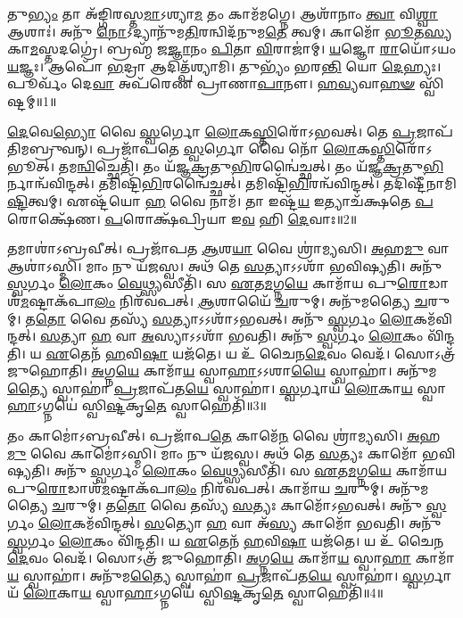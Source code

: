 \setcounter{anuvakam}{0}

   𑌤𑍁\-\ul{𑌭𑍍𑌯𑌂} 𑌤𑌾 𑌅᳴𑌙𑍍𑌗𑌿𑌰𑌸𑍍𑌤\-\ul{𑌮𑌾}\-𑌽𑌶𑍍𑌯𑌾\-\ul{𑌮} 𑌤𑌂 𑌕𑌾𑌮᳴𑌮𑌗𑍍𑌨𑍇।
   𑌆𑌶𑌾᳴𑌨𑌾𑌂 \ul{𑌤𑍍𑌵𑌾} 𑌵𑌿\-\ul{𑌶𑍍𑌵𑌾} 𑌆𑌶𑌾𑌃॑।
   𑌅𑌨𑍁᳴ \ul{𑌨𑍋}\-𑌽𑌦𑍍𑌯𑌾𑌨𑍁᳴𑌮\-\ul{𑌤𑌿}\-𑌰𑌨𑍍𑌵𑌿𑌦᳴𑌨𑍁𑌮\-\ul{𑌤𑍇} 𑌤𑍍𑌵𑌮𑍍।
   𑌕𑌾𑌮𑍋᳴ \ul{𑌭𑍂}\-𑌤\-\ul{𑌸𑍍𑌯} 𑌕𑌾\-\ul{𑌮}\-𑌸𑍍𑌤𑌦𑌗𑍍𑌰𑍇॑।
   𑌬𑍍𑌰𑌹𑍍𑌮᳴ 𑌜\-\ul{𑌜𑍍𑌞𑌾}\-𑌨𑌂 \ul{𑌪𑌿}\-𑌤𑌾 \ul{𑌵𑌿}\-𑌰𑌾𑌜𑌾॑𑌮𑍍।
   \ul{𑌯}\-𑌜𑍍𑌞𑍋 \ul{𑌰𑌾}\-𑌯𑍋᳴𑌽𑌯𑌂 \ul{𑌯}\-𑌜𑍍𑌞𑌃।
   𑌆𑌪𑍋᳴ \ul{𑌭}\-𑌦𑍍𑌰𑌾 𑌆𑌦𑌿𑌤𑍍𑌪᳴𑌶𑍍𑌯𑌾𑌮𑌿।
   𑌤𑍁𑌭𑍍𑌯𑌂᳴ 𑌭𑌰\-\ul{𑌨𑍍𑌤𑌿} 𑌯𑍋 \ul{𑌦𑍇}\-𑌹𑍍𑌯𑌃।
   𑌪𑍂𑌰𑍍𑌵𑌂᳴ 𑌦𑍇\-\ul{𑌵𑌾} 𑌅𑌪᳴𑌰𑍇𑌣 𑌪𑍍𑌰𑌾𑌣𑌾\-\ul{𑌪𑌾}\-𑌨𑍗।
   \ul{𑌹}\-\-\ul{𑌵𑍍𑌯}\-𑌵𑌾\-\ul{𑌹}\-\-\ul{𑍟} 𑌸𑍍𑌵𑌿᳴𑌷𑍍𑌟𑌮𑍍॥1॥\anuvakamend
  

   \ul{𑌦𑍇}\-𑌵𑍇\-\ul{𑌭𑍍𑌯𑍋} 𑌵𑍈 \ul{𑌸𑍍𑌵}\-𑌰𑍍𑌗𑍋 \ul{𑌲𑍋}\-𑌕\-\ul{𑌸𑍍𑌤𑌿}\-𑌰𑍋᳴𑌽𑌭𑌵𑌤𑍍।
   𑌤𑍇 \ul{𑌪𑍍𑌰}\-𑌜𑌾𑌪᳴𑌤𑌿𑌮𑌬𑍍𑌰𑍁𑌵𑌨𑍍।
   𑌪𑍍𑌰𑌜𑌾᳴𑌪𑌤𑍇 \ul{𑌸𑍍𑌵}\-𑌰𑍍𑌗𑍋 𑌵𑍈 𑌨𑍋᳴ \ul{𑌲𑍋}\-𑌕\-\ul{𑌸𑍍𑌤𑌿}\-𑌰𑍋᳴𑌽𑌭𑍂𑌤𑍍।
   𑌤𑌮\-\ul{𑌨𑍍𑌵𑌿}\-𑌚𑍍𑌛𑍇𑌤𑌿᳴।
   𑌤𑌂 𑌯᳴𑌜𑍍𑌞\-\ul{𑌕𑍍𑌰}\-𑌤𑍁\-\ul{𑌭𑌿}\-𑌰𑌨𑍍𑌵𑍈॑𑌚𑍍𑌛𑌤𑍍।
   𑌤𑌂 𑌯᳴𑌜𑍍𑌞\-\ul{𑌕𑍍𑌰}\-𑌤𑍁\-\ul{𑌭𑌿}\-𑌰𑍍𑌨𑌾𑌨𑍍𑌵᳴𑌵𑌿𑌨𑍍𑌦𑌤𑍍।
   𑌤𑌮𑌿𑌷𑍍𑌟𑌿᳴\-\ul{𑌭𑌿}\-𑌰𑌨𑍍𑌵𑍈॑𑌚𑍍𑌛𑌤𑍍।
   𑌤𑌮𑌿𑌷𑍍𑌟𑌿᳴\-\ul{𑌭𑌿}\-𑌰𑌨𑍍𑌵᳴𑌵𑌿𑌨𑍍𑌦𑌤𑍍।
   𑌤𑌦𑌿𑌷𑍍𑌟𑍀᳴𑌨𑌾𑌮𑌿\-\ul{𑌷𑍍𑌟𑌿}\-\-𑌤𑍍𑌵𑌮𑍍।
   𑌏𑌷𑍍𑌟᳴𑌯𑍋 \ul{𑌹} 𑌵𑍈 𑌨𑌾𑌮᳴।
   𑌤𑌾 𑌇𑌷𑍍𑌟᳴\-\ul{𑌯} 𑌇𑌤𑍍𑌯𑌾𑌚᳴𑌕𑍍𑌷𑌤𑍇 \ul{𑌪}\-𑌰𑍋𑌕𑍍𑌷𑍇᳴𑌣।
   \ul{𑌪}\-𑌰𑍋𑌕𑍍𑌷᳴𑌪𑍍𑌰𑌿𑌯𑌾 𑌇\-\ul{𑌵} 𑌹𑌿 \ul{𑌦𑍇}\-𑌵𑌾𑌃॥2॥

   𑌤𑌮𑌾𑌶𑌾॑𑌽𑌬𑍍𑌰𑌵𑍀𑌤𑍍।
   𑌪𑍍𑌰𑌜𑌾᳴𑌪𑌤 \ul{𑌆}\-𑌶\-\ul{𑌯𑌾} 𑌵𑍈 𑌶𑍍𑌰𑌾॑𑌮𑍍𑌯𑌸𑌿।
   \ul{𑌅}\-𑌹\-\ul{𑌮𑍁} 𑌵𑌾 𑌆𑌶𑌾॑𑌽𑌸𑍍𑌮𑌿।
   𑌮𑌾𑌂 𑌨𑍁 𑌯᳴𑌜𑌸𑍍𑌵।
   𑌅𑌥᳴ 𑌤𑍇 \ul{𑌸}\-𑌤𑍍𑌯𑌾𑌽𑌽𑌶𑌾᳴ 𑌭𑌵𑌿𑌷𑍍𑌯𑌤𑌿।
   𑌅𑌨𑍁᳴ \ul{𑌸𑍍𑌵}\-𑌰𑍍𑌗𑌂 \ul{𑌲𑍋}\-𑌕𑌂 \ul{𑌵𑍇}\-𑌥𑍍𑌸𑍍𑌯𑌸𑍀𑌤𑌿᳴।
   𑌸 \ul{𑌏}\-𑌤\-\ul{𑌮}\-𑌗𑍍𑌨\-\ul{𑌯𑍇} 𑌕𑌾𑌮𑌾᳴𑌯 𑌪𑍁\-\ul{𑌰𑍋}\-𑌡𑌾𑌶᳴\-\ul{𑌮}\-𑌷𑍍𑌟𑌾𑌕᳴𑌪𑌾\-\ul{𑌲𑌂} 𑌨𑌿𑌰᳴𑌵𑌪𑌤𑍍।
   \ul{𑌆}\-𑌶𑌾𑌯𑍈᳴ \ul{𑌚}\-𑌰𑍁𑌮𑍍।
   𑌅𑌨𑍁᳴𑌮𑌤𑍍𑌯𑍈 \ul{𑌚}\-𑌰𑍁𑌮𑍍।
   𑌤\-\ul{𑌤𑍋} 𑌵𑍈 𑌤𑌸𑍍𑌯᳴ \ul{𑌸}\-𑌤𑍍𑌯𑌾𑌽𑌽𑌶𑌾᳴𑌽𑌭𑌵𑌤𑍍।
   𑌅𑌨𑍁᳴ \ul{𑌸𑍍𑌵}\-𑌰𑍍𑌗𑌂 \ul{𑌲𑍋}\-𑌕𑌮᳴𑌵𑌿𑌨𑍍𑌦𑌤𑍍।
   \ul{𑌸}\-𑌤𑍍𑌯𑌾 \ul{𑌹} 𑌵𑌾 \ul{𑌅}\-𑌸𑍍𑌯𑌾𑌽𑌽𑌶𑌾᳴ 𑌭𑌵𑌤𑌿।
   𑌅𑌨𑍁᳴ \ul{𑌸𑍍𑌵}\-𑌰𑍍𑌗𑌂 \ul{𑌲𑍋}\-𑌕𑌂 𑌵𑌿᳴𑌨𑍍𑌦𑌤𑌿।
   𑌯 \ul{𑌏}\-𑌤𑍇𑌨᳴ \ul{𑌹}\-𑌵𑌿\-\ul{𑌷𑌾} 𑌯𑌜᳴𑌤𑍇।
   𑌯 𑌉᳴ 𑌚𑍈𑌨\-\ul{𑌦𑍇}\-𑌵𑌂 𑌵𑍇𑌦᳴।
   𑌸𑍋𑌽𑌤𑍍𑌰᳴ 𑌜𑍁𑌹𑍋𑌤𑌿।
   \ul{𑌅}\-𑌗𑍍𑌨\-\ul{𑌯𑍇} 𑌕𑌾𑌮𑌾᳴\-\ul{𑌯} 𑌸𑍍𑌵𑌾\-\ul{𑌹𑌾}\-𑌽𑌽𑌶𑌾\-\ul{𑌯𑍈} 𑌸𑍍𑌵𑌾𑌹𑌾॑।
   𑌅𑌨𑍁᳴𑌮\-\ul{𑌤𑍍𑌯𑍈} 𑌸𑍍𑌵𑌾𑌹𑌾॑ \ul{𑌪𑍍𑌰}\-𑌜𑌾𑌪᳴𑌤\-\ul{𑌯𑍇} 𑌸𑍍𑌵𑌾𑌹𑌾॑।
   \ul{𑌸𑍍𑌵}\-𑌰𑍍𑌗𑌾𑌯᳴ \ul{𑌲𑍋}\-𑌕𑌾\-\ul{𑌯} 𑌸𑍍𑌵𑌾\-\ul{𑌹𑌾}\-𑌽𑌗𑍍𑌨𑌯𑍇॑ 𑌸𑍍𑌵𑌿\-\ul{𑌷𑍍𑌟}\-𑌕𑍃\-\ul{𑌤𑍇} 𑌸𑍍𑌵𑌾𑌹𑍇𑌤𑌿᳴॥3॥

   𑌤𑌂 𑌕𑌾𑌮𑍋॑𑌽𑌬𑍍𑌰𑌵𑍀𑌤𑍍।
   𑌪𑍍𑌰𑌜𑌾᳴𑌪\-\ul{𑌤𑍇} 𑌕𑌾𑌮𑍇᳴\-\ul{𑌨} 𑌵𑍈 𑌶𑍍𑌰𑌾॑𑌮𑍍𑌯𑌸𑌿।
   \ul{𑌅}\-𑌹\-\ul{𑌮𑍁} 𑌵𑍈 𑌕𑌾𑌮𑍋॑𑌽𑌸𑍍𑌮𑌿।
   𑌮𑌾𑌂 𑌨𑍁 𑌯᳴𑌜𑌸𑍍𑌵।
   𑌅𑌥᳴ 𑌤𑍇 \ul{𑌸}\-𑌤𑍍𑌯𑌃 𑌕𑌾𑌮𑍋᳴ 𑌭𑌵𑌿𑌷𑍍𑌯𑌤𑌿।
   𑌅𑌨𑍁᳴ \ul{𑌸𑍍𑌵}\-𑌰𑍍𑌗𑌂 \ul{𑌲𑍋}\-𑌕𑌂 \ul{𑌵𑍇}\-𑌥𑍍𑌸𑍍𑌯𑌸𑍀𑌤𑌿᳴।
   𑌸 \ul{𑌏}\-𑌤\-\ul{𑌮}\-𑌗𑍍𑌨\-\ul{𑌯𑍇} 𑌕𑌾𑌮𑌾᳴𑌯 𑌪𑍁\-\ul{𑌰𑍋}\-𑌡𑌾𑌶᳴\-\ul{𑌮}\-𑌷𑍍𑌟𑌾𑌕᳴𑌪𑌾\-\ul{𑌲𑌂} 𑌨𑌿𑌰᳴𑌵𑌪𑌤𑍍।
   𑌕𑌾𑌮𑌾᳴𑌯 \ul{𑌚}\-𑌰𑍁𑌮𑍍।
   𑌅𑌨𑍁᳴𑌮𑌤𑍍𑌯𑍈 \ul{𑌚}\-𑌰𑍁𑌮𑍍।
   𑌤\-\ul{𑌤𑍋} 𑌵𑍈 𑌤𑌸𑍍𑌯᳴ \ul{𑌸}\-𑌤𑍍𑌯𑌃 𑌕𑌾𑌮𑍋᳴𑌽𑌭𑌵𑌤𑍍।
   𑌅𑌨𑍁᳴ \ul{𑌸𑍍𑌵}\-𑌰𑍍𑌗𑌂 \ul{𑌲𑍋}\-𑌕𑌮᳴𑌵𑌿𑌨𑍍𑌦𑌤𑍍।
   \ul{𑌸}\-𑌤𑍍𑌯𑍋 \ul{𑌹} 𑌵𑌾 𑌅᳴\-\ul{𑌸𑍍𑌯} 𑌕𑌾𑌮𑍋᳴ 𑌭𑌵𑌤𑌿।
   𑌅𑌨𑍁᳴ \ul{𑌸𑍍𑌵}\-𑌰𑍍𑌗𑌂 \ul{𑌲𑍋}\-𑌕𑌂 𑌵𑌿᳴𑌨𑍍𑌦𑌤𑌿।
   𑌯 \ul{𑌏}\-𑌤𑍇𑌨᳴ \ul{𑌹}\-𑌵𑌿\-\ul{𑌷𑌾} 𑌯𑌜᳴𑌤𑍇।
   𑌯 𑌉᳴ 𑌚𑍈𑌨\-\ul{𑌦𑍇}\-𑌵𑌂 𑌵𑍇𑌦᳴।
   𑌸𑍋𑌽𑌤𑍍𑌰᳴ 𑌜𑍁𑌹𑍋𑌤𑌿।
   \ul{𑌅}\-𑌗𑍍𑌨\-\ul{𑌯𑍇} 𑌕𑌾𑌮𑌾᳴\-\ul{𑌯} 𑌸𑍍𑌵𑌾\-\ul{𑌹𑌾} 𑌕𑌾𑌮𑌾᳴\-\ul{𑌯} 𑌸𑍍𑌵𑌾𑌹𑌾॑।
   𑌅𑌨𑍁᳴𑌮\-\ul{𑌤𑍍𑌯𑍈} 𑌸𑍍𑌵𑌾𑌹𑌾॑ \ul{𑌪𑍍𑌰}\-𑌜𑌾𑌪᳴𑌤\-\ul{𑌯𑍇} 𑌸𑍍𑌵𑌾𑌹𑌾॑।
   \ul{𑌸𑍍𑌵}\-𑌰𑍍𑌗𑌾𑌯᳴ \ul{𑌲𑍋}\-𑌕𑌾\-\ul{𑌯} 𑌸𑍍𑌵𑌾\-\ul{𑌹𑌾}\-𑌽𑌗𑍍𑌨𑌯𑍇॑ 𑌸𑍍𑌵𑌿\-\ul{𑌷𑍍𑌟}\-𑌕𑍃\-\ul{𑌤𑍇} 𑌸𑍍𑌵𑌾𑌹𑍇𑌤𑌿᳴॥4॥


